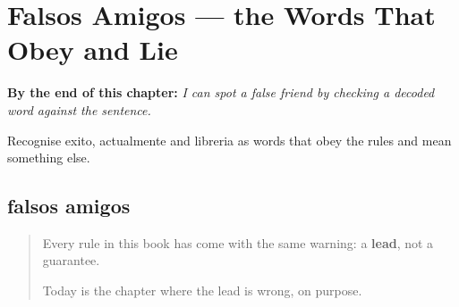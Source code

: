 
\chapter{Falsos Amigos --- the Words That Obey and Lie}
\label{ch:falsos-amigos}

\begin{chapteropening}
\textbf{By the end of this chapter:} \emph{I can spot a false friend by checking a decoded word against the sentence.}

Recognise exito, actualmente and libreria as words that obey the rules and mean something else.
\end{chapteropening}

\section[falsos amigos]{falsos amigos}

\label{lesson:ES-C09-falsos-amigos}



\begin{quote}
Every rule in this book has come with the same warning: a \textbf{lead}, not a guarantee.

Today is the chapter where the lead is wrong, on purpose.
\end{quote}

